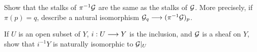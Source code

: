 \begin{exr}
Show that the stalks of $\pi^{-1}{\cal G}$ are the same as the stalks of ${\cal G}$. More precisely, if $\pi(p)=q$, describe a natural isomorphism ${\cal G}_q\longrightarrow (\pi^{-1}{\cal G})_p$.
\end{exr}

\begin{exr}
If $U$ is an open subset of $Y$, $i:U\longrightarrow Y$ is the inclusion, and ${\cal G}$ is a sheaf on $Y$, show that $i^{-1}Y$ is naturally isomorphic to ${\cal G}|_U$
\end{exr}